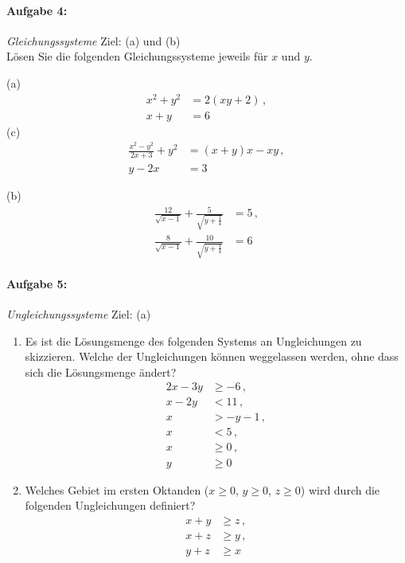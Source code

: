 \paragraph{Aufgabe 4: } \emph{Gleichungssysteme} \hfill Ziel: (a) und (b)\\[0.2cm]
Lösen Sie die folgenden Gleichungssysteme jeweils für $x$ und $y$.\\[0.5cm]
\begin{minipage}[t]{0.45\linewidth}
(a)\vspace{-2.7em}
\begin{align*}
    x^2+y^2&=2(xy+2)\,,\\ x+y&=6
\end{align*}
(c)\vspace{-2,7em}
\begin{align*}
    \frac{x^2-y^2}{2x+3}+y^2&=(x+y)x-xy\,,\\
    y-2x&=3
\end{align*}
\end{minipage}\hfill
\begin{minipage}[t]{0.4\linewidth}
(b)\vspace{-2.7em}
\begin{align*}
    \frac{12}{\sqrt{x-1}}+\frac{5}{\sqrt{y+\frac{1}{4}}}&=5\,,\\ \frac{8}{\sqrt{x-1}}+\frac{10}{\sqrt{y+\frac{1}{4}}}&=6
\end{align*}
\end{minipage}
%
\paragraph{Aufgabe 5: } \emph{Ungleichungssysteme} \hfill Ziel: (a)\\
\begin{enumerate}[label=(\alph*), labelindent=1em,labelsep=0.5cm]
\item Es ist die Lösungsmenge des folgenden Systems an Ungleichungen zu skizzieren. Welche der Ungleichungen können weggelassen werden, ohne dass sich die Lösungsmenge ändert?
\begin{align*}
    2x-3y&\geq -6\,,\\
    x-2y&< 11\,,\\
    x&>-y-1\,,\\
    x&<5\,,\\
    x&\geq 0\,,\\
    y&\geq 0
\end{align*}
\item Welches Gebiet im ersten Oktanden ($x\ge 0$, $y\ge 0$, $z\ge 0$) wird durch die folgenden Ungleichungen definiert?
\begin{align*}
    x+y&\ge z\,,\\
    x+z&\ge y\,,\\
    y+z&\ge x
\end{align*}
\end{enumerate}